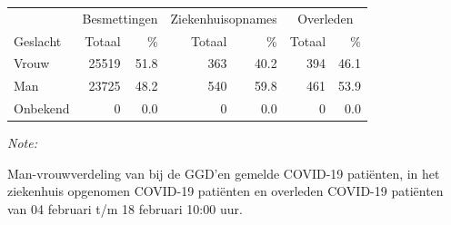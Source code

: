 \documentclass[
  english,
  man,floatsintext]{apa6}
\begin{document}
\begin{table}[H]
\centering\begingroup\fontsize{11}{13}\selectfont

\begin{threeparttable}
\begin{tabular}{lrrrrrr}
\toprule
\multicolumn{1}{c}{ } & \multicolumn{2}{c}{Besmettingen} & \multicolumn{2}{c}{Ziekenhuisopnames} & \multicolumn{2}{c}{Overleden} \\
\cmidrule(l{3pt}r{3pt}){2-3} \cmidrule(l{3pt}r{3pt}){4-5} \cmidrule(l{3pt}r{3pt}){6-7}
Geslacht & Totaal & \% & Totaal & \% & Totaal & \%\\
\midrule
Vrouw & 25519 & 51.8 & 363 & 40.2 & 394 & 46.1\\
Man & 23725 & 48.2 & 540 & 59.8 & 461 & 53.9\\
Onbekend & 0 & 0.0 & 0 & 0.0 & 0 & 0.0\\
\bottomrule
\end{tabular}
\begin{tablenotes}
\item \textit{Note: } 
\item Man-vrouwverdeling van bij de GGD’en gemelde COVID-19 patiënten, in het ziekenhuis opgenomen COVID-19 patiënten en overleden COVID-19 patiënten van 04 februari t/m 18 februari 10:00 uur.
\end{tablenotes}
\end{threeparttable}
\endgroup{}
\end{table}
\newpage
\end{document}
